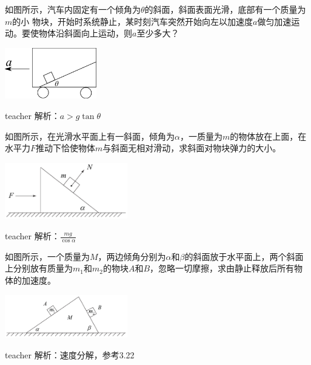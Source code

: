 \begin{example}
	如图所示，汽车内固定有一个倾角为$\theta$的斜面，斜面表面光滑，底部有一个质量为$ m $的小
	物块，开始时系统静止，某时刻汽车突然开始向左以加速度$a $做匀加速运动。要使物体沿斜面向上运动，则$ a $至少多大？
		\begin{flushright}
			\includegraphics[width = 0.3\textwidth]{images/newton-13.pdf} 
		\end{flushright}
	\begin{taggedblock}{teacher}
		\noindent
		解析：$a>g\tan\theta$
	\end{taggedblock}
\end{example}


\begin{example}
	如图所示，在光滑水平面上有一斜面，倾角为$\alpha$，一质量为$m$的物体放在上面，在水平力$F$推动下恰使物体$m$与斜面无相对滑动，求斜面对物块弹力的大小。
	\begin{flushright}
		\includegraphics[width = 0.4\textwidth]{images/newton-9.pdf} 
	\end{flushright}
	
	\begin{taggedblock}{teacher}
		\noindent
		解析：$\frac{mg}{\cos\alpha}$
	\end{taggedblock}
\end{example}


\begin{example}
	如图所示，一个质量为$M$，两边倾角分别为$\alpha$和$\beta$的斜面放于水平面上，两个斜面上分别放有质量为$m_1$和$m_2$的物块$A$和$B$，忽略一切摩擦，求由静止释放后所有物体的加速度。
	\begin{flushright}
		\includegraphics[width = 0.4\textwidth]{images/newton-4.pdf} 
	\end{flushright}
	
	\begin{taggedblock}{teacher}
		\noindent
		解析：速度分解，参考3.22
	\end{taggedblock}
\end{example}

